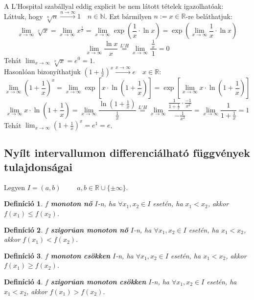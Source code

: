 \documentclass[a4paper,12pt,twoside]{book}
\newtheorem{defi}{Definíció}[chapter]
\theoremstyle{break}
\theoremstyle{plain}
\begin{document}
A L'Hospital szabállyal eddig explicit be nem látott tételek igazolhatóak:\\
Láttuk, hogy $\sqrt[n]{n} \xrightarrow{n\to\infty} 1 \quad n\in\mathbb{N}$. Ezt bármilyen $n:= x\in\mathbb{R}$-re beláthatjuk:
\[\lim_{x\to\infty} \sqrt[x]{x} = \lim_{x\to\infty} x^{\frac{1}{x}} = \lim_{x\to\infty} \exp\left(\frac{1}{x}\cdot\ln x\right) = \exp\left(\lim_{x\to\infty} \frac{1}{x}\cdot\ln x\right)\]
\[\lim_{x\to\infty} \frac{\ln x}{x} \overset{L'H}{=} \lim_{x\to\infty} \frac{\frac{1}{x}}{~1~} = 0\]
Tehát $\displaystyle \lim_{x\to\infty} \sqrt[x]{x} = e^0 = 1$.\\

Hasonlóan bizonyíthatjuk $\displaystyle \left(1+\frac{1}{x}\right)^x \xrightarrow{x\to\infty} e \quad x\in\mathbb{R}$:
\[\lim_{x\to\infty} \left(1+\frac{1}{x}\right)^x = \lim_{x\to\infty} \exp\left[x\cdot\ln\left(1+\frac{1}{x}\right)\right] =  \exp\left[\lim_{x\to\infty} x\cdot\ln\left(1+\frac{1}{x}\right)\right] \]
\[\lim_{x\to\infty} x\cdot\ln\left(1+\frac{1}{x}\right) = \lim_{x\to\infty} \frac{\ln\left(1+\frac{1}{x}\right)}{\frac{1}{x}} \overset{L'H}{=} \lim_{x\to\infty} \frac{\frac{1}{1+\frac{1}{x}}\cdot \frac{-1}{x^2}}{-\frac{1}{x^2}} = \lim_{x\to\infty} \frac{1}{1+\frac{1}{x}} = 1\]
Tehát $\displaystyle \lim_{x\to\infty} \left(1+\frac{1}{x}\right)^x = e^1 = e$.

\subsection{Nyílt intervallumon differenciálható függvények tulajdonsá\-gai}

Legyen $I=(a,b)$ $\qquad a,b\in\mathbb{R}\cup\{\pm\infty\}$.

\begin{defi}
 $f$ \textbf{monoton nő} $I$-n, ha $\forall x_1, x_2\in I$ esetén, ha $x_1<x_2$, akkor $f(x_1)\leqslant f(x_2)$.
\end{defi}
\begin{defi}
 $f$ \textbf{szigorúan monoton nő} $I$-n, ha $\forall x_1, x_2\in I$ esetén, ha $x_1<x_2$, akkor $f(x_1)< f(x_2)$.
\end{defi}

\begin{defi}
 $f$ \textbf{monoton csökken} $I$-n, ha $\forall x_1, x_2\in I$ esetén, ha $x_1<x_2$, akkor $f(x_1)\geqslant f(x_2)$.
\end{defi}
\begin{defi}
 $f$ \textbf{szigorúan monoton csökken} $I$-n, ha $\forall x_1, x_2\in I$ esetén, ha $x_1<x_2$, akkor $f(x_1)>f(x_2)$.
\end{defi}
\end{document}
